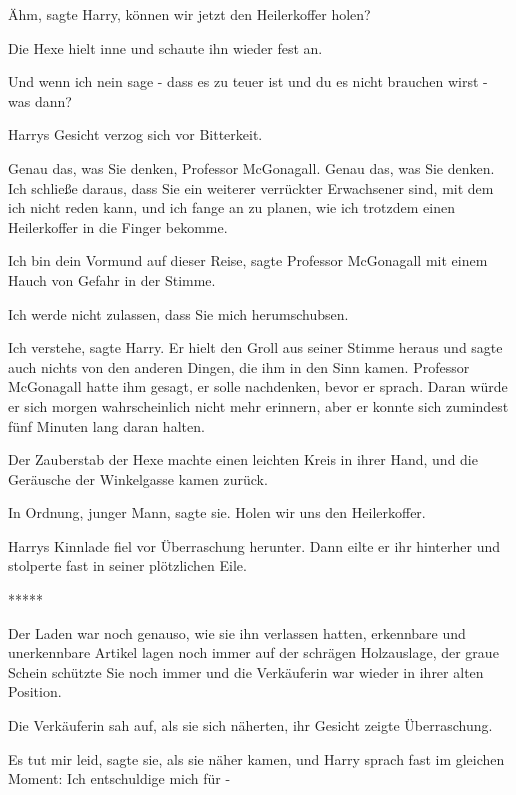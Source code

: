 \glqq{}Ähm\grqq{}, sagte Harry, \glqq{}können wir jetzt den Heilerkoffer
holen?\grqq{}

Die Hexe hielt inne und schaute ihn wieder fest an.

\glqq{}Und wenn ich nein sage - dass es zu teuer ist und du es nicht brauchen
wirst - was dann?\grqq{}

Harrys Gesicht verzog sich vor Bitterkeit.

\glqq{}Genau das, was Sie denken, Professor McGonagall. Genau das, was Sie
denken. Ich schließe daraus, dass Sie ein weiterer verrückter Erwachsener sind,
mit dem ich nicht reden kann, und ich fange an zu planen, wie ich trotzdem einen
Heilerkoffer in die Finger bekomme.\grqq{}

\glqq{}Ich bin dein Vormund auf dieser Reise\grqq{}, sagte Professor McGonagall
mit einem Hauch von Gefahr in der Stimme.

\glqq{}Ich werde nicht zulassen, dass Sie mich herumschubsen.\grqq{}

\glqq{}Ich verstehe\grqq{}, sagte Harry. Er hielt den Groll aus seiner Stimme
heraus und sagte auch nichts von den anderen Dingen, die ihm in den Sinn kamen.
Professor McGonagall hatte ihm gesagt, er solle nachdenken, bevor er sprach.
Daran würde er sich morgen wahrscheinlich nicht mehr erinnern, aber er konnte
sich zumindest fünf Minuten lang daran halten.

Der Zauberstab der Hexe machte einen leichten Kreis in ihrer Hand, und die
Geräusche der Winkelgasse kamen zurück.

\glqq{}In Ordnung, junger Mann\grqq{}, sagte sie. \glqq{}Holen wir uns den
Heilerkoffer.\grqq{}

Harrys Kinnlade fiel vor Überraschung herunter. Dann eilte er ihr hinterher und
stolperte fast in seiner plötzlichen Eile.

\begin{center}*****\end{center}

Der Laden war noch genauso, wie sie ihn verlassen hatten, erkennbare und
unerkennbare Artikel lagen noch immer auf der schrägen Holzauslage, der graue
Schein schützte Sie noch immer und die Verkäuferin war wieder in ihrer alten
Position.

Die Verkäuferin sah auf, als sie sich näherten, ihr Gesicht zeigte Überraschung.

\glqq{}Es tut mir leid\grqq{}, sagte sie, als sie näher kamen, und Harry sprach
fast im gleichen Moment: \glqq{}Ich entschuldige mich für -\grqq{}

